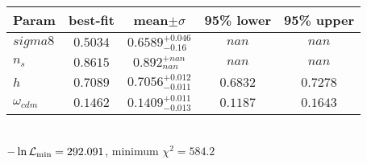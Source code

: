 \begin{tabular}{|l|c|c|c|c|} 
 \hline 
Param & best-fit & mean$\pm\sigma$ & 95\% lower & 95\% upper \\ \hline 
$sigma8$ &$0.5034$ & $0.6589_{-0.16}^{+0.046}$ & $nan$ & $nan$ \\ 
$n_{s }$ &$0.8615$ & $0.892_{nan}^{+nan}$ & $nan$ & $nan$ \\ 
$h$ &$0.7089$ & $0.7056_{-0.011}^{+0.012}$ & $0.6832$ & $0.7278$ \\ 
$\omega{}_{cdm }$ &$0.1462$ & $0.1409_{-0.013}^{+0.011}$ & $0.1187$ & $0.1643$ \\ 
\hline 
 \end{tabular} \\ 
$-\ln{\cal L}_\mathrm{min} =292.091$, minimum $\chi^2=584.2$ \\ 
